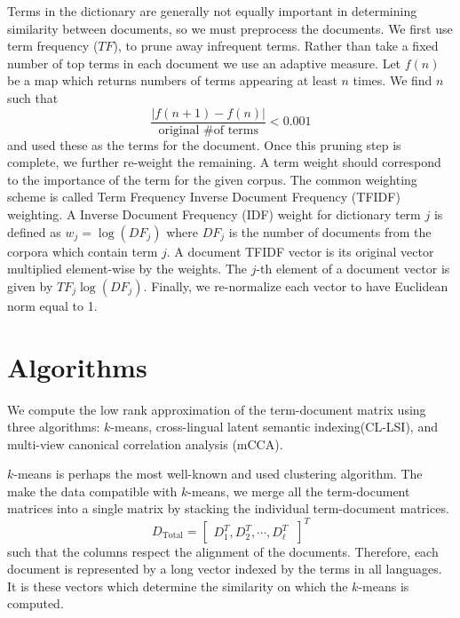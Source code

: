 \documentclass{article} %
\begin{document}
Terms in the dictionary are generally not equally important in
determining similarity between documents, so we must preprocess
the documents. We first use term frequency ($TF$), to prune away
infrequent terms. Rather than take a fixed number of top terms in
each document we use an adaptive measure. Let $f(n)$ be a map
which returns numbers of terms appearing at least $n$ times.  We
find $n$ such that
\begin{equation}
\frac{|f(n+1) - f(n)|}{\mbox{original \# of terms}} < 0.001
\end{equation}
and used these as the terms for the document. Once this pruning
step is complete, we further re-weight the remaining. A term
weight should correspond to the importance of the term for the
given corpus.  The common weighting scheme is called Term
Frequency Inverse Document Frequency (TFIDF) weighting. A
Inverse Document Frequency (IDF) weight for dictionary term $j$
is defined as $w_j = \log( DF_j )$ where $DF_j$ is the number of
documents from the corpora which contain term $j$.  A document
TFIDF vector is its original vector multiplied element-wise by the
weights. The $j$-th element of a document vector is given by $
TF_j \log( DF_j )$. Finally, we re-normalize each vector to have
Euclidean norm equal to 1.


\begin{comment}
We will consider linear combinations of terms as ``concepts.'' The
magnitude of the coefficients of a term in a given combination
could be interpreted as the level of membership of that given
term to the concept. For the application point of view, these
could be interpreted as generalized versions of sets of
terms. Geometrically, we will interpret them as directions in the
term-space.
\end{comment}



\section{Algorithms}
\label{sec:alg}
We compute the low rank approximation of the term-document
matrix using three algorithms: $k$-means\cite{h-ca-75},
cross-lingual latent semantic indexing(CL-LSI)\cite{cl_lsi}, and
multi-view canonical correlation analysis (mCCA)\cite{Kettenring}.

$k$-means is perhaps the most well-known and used clustering
algorithm. The make the data compatible with $k$-means, we merge
all the term-document matrices into a single matrix by stacking
the individual term-document matrices.
\begin{equation}
D_{\mbox{Total}} = \begin{bmatrix}D^T_1 ,D^T_2, \cdots,D^T_\ell\
\end{bmatrix}
^T
\end{equation}
such that the columns respect the alignment of the
documents. Therefore, each document is represented by a long
vector indexed by the terms in all languages. It is these vectors
which determine the similarity on which the $k$-means is computed.
\end{document}
